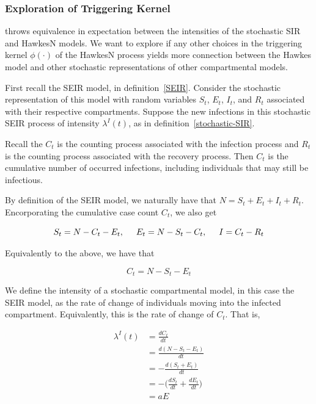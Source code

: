 \documentclass[12pt]{article}
\begin{document}



\subsubsection{Exploration of Triggering Kernel}

\cite{Rizoiu2018} throws equivalence in expectation between the intensities of the stochastic SIR and HawkesN models. We want to explore if any other choices in the triggering kernel $\phi(\cdot )$ of the HawkesN process yields more connection between the Hawkes model and other stochastic representations of other compartmental models. 

First recall the SEIR model, in definition~\ref{SEIR}. Consider the stochastic representation of this  model with random variables $S_t$, $E_t$, $I_t$, and $R_t$ associated with their respective compartments. Suppose the new infections in this stochastic SEIR process of intensity $\lambda^I(t)$, as in definition~\ref{stochastic-SIR}.

Recall the $C_t$ is the counting process associated with the infection process and $R_t$ is the counting process associated with the recovery process. Then $C_t$ is the cumulative number of occurred infections, including individuals that may still be infectious. 

By definition of the SEIR model, we naturally have that $N = S_t + E_t + I_t + R_t$. Encorporating the cumulative case count $C_t$, we also get

\[
S_t = N - C_t - E_t, \hspace* {5mm}
E_t = N - S_t - C_t, \hspace*{5mm}
I = C_t - R_t
\]

Equivalently to the above, we have that

\[
C_t = N - S_t - E_t
\]

We define the intensity of a stochastic compartmental model, in this case the SEIR model, as the rate of change of individuals moving into the infected compartment. Equivalently, this is the rate of change of $C_t$. That is, 

\begin{align*}
  \lambda^I(t) &= \frac{dC_t}{dt} \\
  &= \frac{d (N - S_t - E_t)}{dt} \\
  &= - \frac{d(S_t + E_t)}{dt} \\
  &= - \Big ( \frac{dS_t}{dt} + \frac{dE_t}{dt} \Big ) \\
  &= aE
\end{align*}
\end{document}
